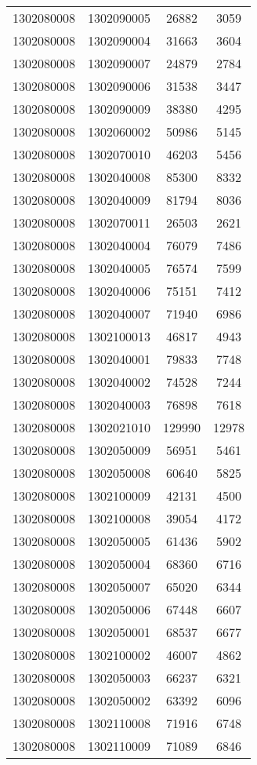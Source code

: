 \begin{longtable}{llcc}
1302080008 & 1302090005 & 26882 & 3059\\
1302080008 & 1302090004 & 31663 & 3604\\
1302080008 & 1302090007 & 24879 & 2784\\
1302080008 & 1302090006 & 31538 & 3447\\
1302080008 & 1302090009 & 38380 & 4295\\
1302080008 & 1302060002 & 50986 & 5145\\
1302080008 & 1302070010 & 46203 & 5456\\
1302080008 & 1302040008 & 85300 & 8332\\
1302080008 & 1302040009 & 81794 & 8036\\
1302080008 & 1302070011 & 26503 & 2621\\
1302080008 & 1302040004 & 76079 & 7486\\
1302080008 & 1302040005 & 76574 & 7599\\
1302080008 & 1302040006 & 75151 & 7412\\
1302080008 & 1302040007 & 71940 & 6986\\
1302080008 & 1302100013 & 46817 & 4943\\
1302080008 & 1302040001 & 79833 & 7748\\
1302080008 & 1302040002 & 74528 & 7244\\
1302080008 & 1302040003 & 76898 & 7618\\
1302080008 & 1302021010 & 129990 & 12978\\
1302080008 & 1302050009 & 56951 & 5461\\
1302080008 & 1302050008 & 60640 & 5825\\
1302080008 & 1302100009 & 42131 & 4500\\
1302080008 & 1302100008 & 39054 & 4172\\
1302080008 & 1302050005 & 61436 & 5902\\
1302080008 & 1302050004 & 68360 & 6716\\
1302080008 & 1302050007 & 65020 & 6344\\
1302080008 & 1302050006 & 67448 & 6607\\
1302080008 & 1302050001 & 68537 & 6677\\
1302080008 & 1302100002 & 46007 & 4862\\
1302080008 & 1302050003 & 66237 & 6321\\
1302080008 & 1302050002 & 63392 & 6096\\
1302080008 & 1302110008 & 71916 & 6748\\
1302080008 & 1302110009 & 71089 & 6846\\

\end{longtable}
